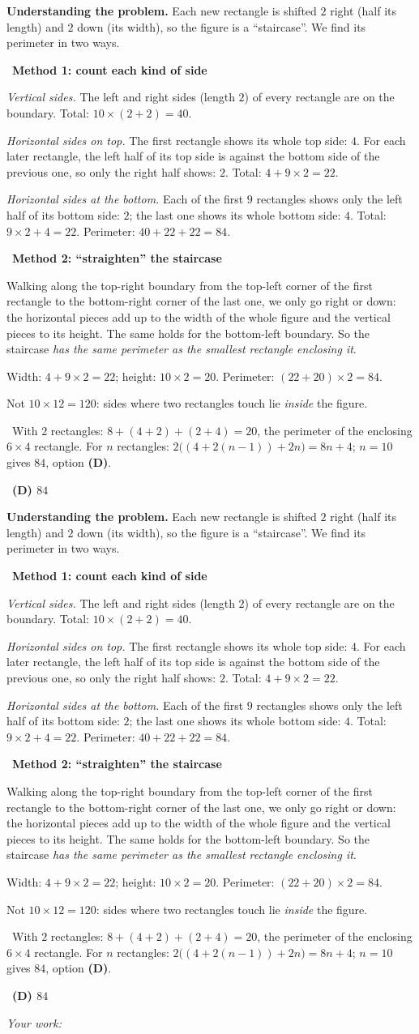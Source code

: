 \documentclass[11pt]{article}
\newif\ifsol \soltrue
\providecommand{\AnsWord}{Đáp số}
\newcommand{\StuProb}[2]{\begin{probboxS}{#1}{#2}\StuProbBody\end{probboxS}}
\newcommand{\ans}[1]{\par\smallskip{\bfseries\color{tmGreen!88!black}\AnsWord:}\ {\bfseries\color{AnsRed}#1}\par}
\newcommand{\probsol}[1]{%
  \begin{lrbox}{\solmeasure}\begin{minipage}{\dimexpr\linewidth-24pt\relax}#1\end{minipage}\end{lrbox}%
  \ifsol
    \begin{solbox}#1\end{solbox}%
  \else
    \setlength{\solht}{\dimexpr\ht\solmeasure+\dp\solmeasure+0.85cm\relax}%
    \ifdim\solht<1.35cm\setlength{\solht}{1.35cm}\fi
    \ifdim\solht>\StudentMaxWork\setlength{\solht}{\StudentMaxWork}\fi
    \par\noindent\begin{minipage}{\linewidth}%
    \expandafter\StuProb\StuProbArgs
    \begin{tcolorbox}[colback=white,colframe=Line,boxrule=0.8pt,arc=5pt,
      left=8pt,right=8pt,top=4pt,bottom=4pt,height=\solht]{\footnotesize\color{Slate}\itshape\WorkWord}\end{tcolorbox}%
    \end{minipage}\par\medskip
  \fi}
\newlength{\StudentMaxWork}\setlength{\StudentMaxWork}{4.5cm}
\newcommand{\step}[2]{\par\smallskip\noindent{\bfseries\color{tmBlue!85!black}\StepWord~#1.}\ {\bfseries #2}\par\nopagebreak}
\newcommand{\verify}[1]{\par\smallskip\noindent{\bfseries\color{tmGreen!80!black}\faCheckCircle\ \CheckWord}\ #1\par}
\def\WorkWord{Your work:}
\def\AnsWord{Answer}
\def\StepWord{Step}
\def\CheckWord{Check:}
\begin{document}
\probsol{
\textbf{Understanding the problem.} Each new rectangle is shifted $2$ right (half its length) and $2$ down (its
width), so the figure is a ``staircase''. We find its perimeter in two ways.

\step{1}{Method 1: count each kind of side}
\emph{Vertical sides.} The left and right sides (length $2$) of every rectangle are on the boundary.
Total: $10\times(2+2)=40$.

\emph{Horizontal sides on top.} The first rectangle shows its whole top side: $4$. For each later rectangle, the
left half of its top side is against the bottom side of the previous one, so only the right half shows: $2$.
Total: $4+9\times 2=22$.

\emph{Horizontal sides at the bottom.} Each of the first $9$ rectangles shows only the left half of its bottom
side: $2$; the last one shows its whole bottom side: $4$. Total: $9\times 2+4=22$. Perimeter: $40+22+22=84$.

\step{2}{Method 2: ``straighten'' the staircase}
\begin{proofbox}Walking along the top-right boundary from the top-left corner of the first rectangle to the
bottom-right corner of the last one, we only go right or down: the horizontal pieces add up to the width of the
whole figure and the vertical pieces to its height. The same holds for the bottom-left boundary. So the staircase
\emph{has the same perimeter as the smallest rectangle enclosing it}.\end{proofbox}
Width: $4+9\times 2=22$; height: $10\times 2=20$. Perimeter: $(22+20)\times 2=84$.

\begin{warnbox}Not $10\times 12=120$: sides where two rectangles touch lie \emph{inside} the figure.\end{warnbox}
\verify{With $2$ rectangles: $8+(4+2)+(2+4)=20$, the perimeter of the enclosing $6\times 4$ rectangle. For
$n$ rectangles: $2\big((4+2(n-1))+2n\big)=8n+4$; $n=10$ gives $84$, option \textbf{(D)}.}
\ans{(D) $84$}
}
\end{document}
